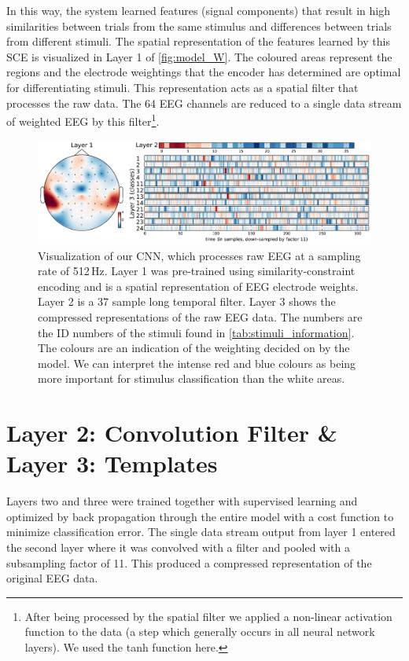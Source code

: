 In this way, the system learned features (signal components) that result in high similarities between trials from the same stimulus and differences between trials from different stimuli.  
The spatial representation of the features learned by this \ac{SCE} is visualized in Layer 1 of \autoref{fig:model_W}. 
The coloured areas represent the regions and the electrode weightings that the encoder has determined are optimal for differentiating stimuli.
This representation acts as a spatial filter that processes the raw data.
The 64 EEG channels are reduced to a single data stream of weighted EEG by this filter\footnote{After being processed by the spatial filter we applied a non-linear activation function to the data (a step which generally occurs in all neural network layers).
We used the tanh function here.}. 
\begin{figure}[h] 
  \begin{center}
    \includegraphics[width=\textwidth,keepaspectratio=true]{Figures/model_W}
    \caption{Visualization of our \ac{CNN}, which processes raw EEG at a sampling rate of 512\,Hz.
    Layer 1 was pre-trained using similarity-constraint encoding and is a spatial representation of EEG electrode weights. Layer 2 is a 37 sample long temporal filter. Layer 3 shows the compressed representations of the raw EEG data. The numbers are the ID numbers of the stimuli found in \autoref{tab:stimuli_information}. The colours are an indication of the weighting decided on by the model. We can interpret the intense red and blue colours as being more important for stimulus classification than the white areas.}
    \label{fig:model_W}
  \end{center}
\end{figure}
\section{Layer 2: Convolution Filter \& Layer 3: Templates}
Layers two and three were trained together with supervised learning and optimized by back propagation through the entire model with a cost function to minimize classification error.
The single data stream output from layer 1 entered the second layer where it was convolved with a filter and pooled with a subsampling factor of 11.
This produced a compressed representation of the original EEG data.

